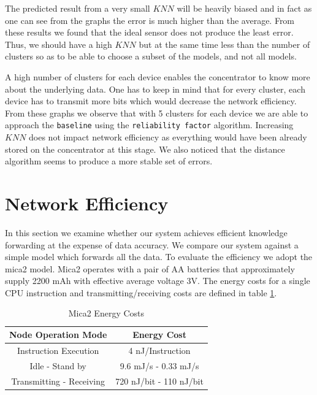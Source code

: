 \documentclass{mproj}
\begin{document}
The predicted result from a very small $KNN$ will be heavily biased and in fact as one can see from the graphs the error is much higher than the average. From these results we found that the ideal sensor does not produce the least error. Thus, we should have a high $KNN$ but at the same time less than the number of clusters so as to be able to choose a subset of the models, and not all models.

A high number of clusters for each device enables the concentrator to know more about the underlying data. One has to keep in mind that for every cluster, each device has to transmit more bits which would decrease the network efficiency. From these graphs we observe that with 5 clusters for each device we are able to approach the \texttt{baseline} using the \texttt{reliability factor} algorithm. Increasing $KNN$ does not impact network efficiency as everything would have been already stored on the concentrator at this stage. We also noticed that the distance algorithm seems to produce a more stable set of errors.

\section{Network Efficiency}
\label{sec:networkefficiency}
In this section we examine whether our system achieves efficient knowledge forwarding at the expense of data accuracy. We compare our system against a simple model which forwards all the data. To evaluate the efficiency we adopt the mica2 \cite{mica2} model. Mica2 operates with a pair of AA batteries that approximately supply 2200 mAh with effective average voltage 3V. The energy costs for a single CPU instruction and transmitting/receiving costs are defined in table \ref{table:energy}.

 \begin{table}[!ht]
 \centering
 \begin{tabular}{||c | c||}
 \hline
 Node Operation Mode & Energy Cost \\
 \hline\hline
 Instruction Execution & 4 nJ/Instruction \\ 
 \hline
 Idle - Stand by & 9.6 mJ/s - 0.33 mJ/s\\
 \hline
 Transmitting - Receiving & 720 nJ/bit - 110 nJ/bit\\
 \hline
\end{tabular}
\caption{Mica2 Energy Costs}
 \label{table:energy} 
\end{table}
\end{document}
